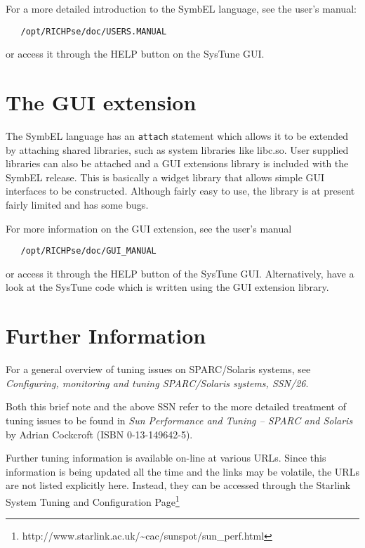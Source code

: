 \documentclass[11pt]{article}
\newcommand{\htmladdnormallinkfoot}[2]{#1\footnote{#2}}
\newcommand{\xref}[3]{#1}
\newcommand{\xlabel}[1]{}
\begin{document}
For a more detailed introduction to the SymbEL language, see the user's
manual:

\begin{verbatim}
   /opt/RICHPse/doc/USERS.MANUAL
\end{verbatim}

or access it through the HELP button on the SysTune GUI.
 
\section{\label{gui}\xlabel{gui}The GUI extension}

The SymbEL language has an {\tt{attach}} statement which allows it to be
extended by attaching shared libraries, such as system libraries like
libc.so. User supplied libraries can also be attached and a GUI extensions
library is included with the SymbEL release. This is basically a widget
library that allows simple GUI interfaces to be constructed. Although
fairly easy to use, the library is at present fairly limited and has some
bugs.

For more information on the GUI extension, see the user's manual

\begin{verbatim}
   /opt/RICHPse/doc/GUI_MANUAL
\end{verbatim}

or access it through the HELP button of the SysTune GUI. Alternatively,
have a look at the SysTune code which is written using the GUI extension
library.

\section{\label{more_info}\xlabel{more_info}Further Information}

For a general overview of tuning issues on SPARC/Solaris systems, see
\xref{{\em{Configuring, monitoring and tuning SPARC/Solaris 
systems}, SSN/26}}{ssn26}{}.

Both this brief note and the above SSN refer to the more detailed treatment
of tuning issues to be found in {\em{Sun Performance and Tuning -- SPARC and
Solaris}} by Adrian Cockcroft (ISBN 0-13-149642-5).

Further tuning information is available on-line at various URLs. Since
this information is being updated all the time and the links may be
volatile, the URLs are not listed explicitly here. Instead, they can be
accessed through \htmladdnormallinkfoot{the Starlink System Tuning and
Configuration Page}{http://www.starlink.ac.uk/\~{}cac/sunspot/sun\_perf.html}
\end{document}
